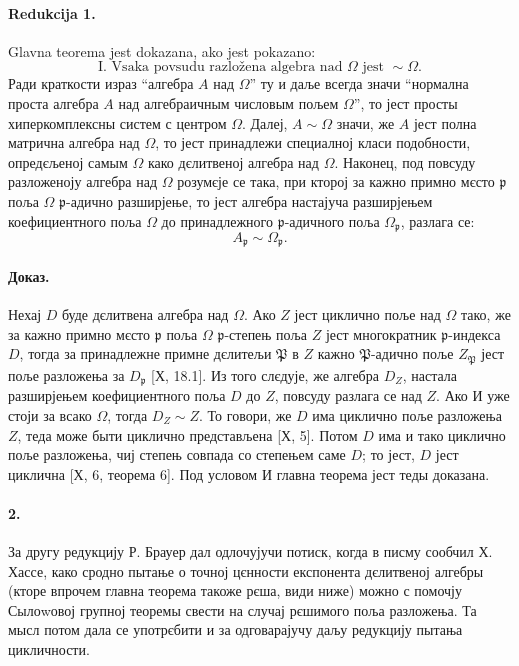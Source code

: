 \documentclass[11pt]{article}
\begin{document}
\paragraph{Redukcija 1.}
Glavna teorema jest dokazana, ako jest pokazano:
\[
\text{I. Vsaka povsudu razložena algebra nad }\Omega\text{ jest } \sim \Omega .
\]
Ради краткости израз ``алгебра \(A\) над \(\Omega\)'' ту и даље всегда значи ``нормална проста алгебра \(A\) над алгебраичным числовым пољем \(\Omega\)'', то јест просты хиперкомплексны систем с центром \(\Omega\). Далеј, \(A\sim\Omega\) значи, же \(A\) јест полна матрична алгебра над \(\Omega\), то јест принадлежи специалној класи подобности, опредєљеној самым \(\Omega\) како дєлитвеној алгебра над \(\Omega\). Наконец, под повсуду разложеноју алгебра над \(\Omega\) розумєје се така, при кторој за кажно примно мєсто \(\mathfrak p\) поља \(\Omega\) \( \mathfrak p\)-адично разширјење, то јест алгебра настајуча разширјењем коефициентного поља \(\Omega\) до принадлежного \( \mathfrak p\)-адичного поља \(\Omega_{\mathfrak p}\), разлага се:
\[
A_{\mathfrak p}\sim \Omega_{\mathfrak p}.
\]

\paragraph{Доказ.}
Нехај \(D\) буде дєлитвена алгебра над \(\Omega\). Ако \(Z\) јест циклично поље над \(\Omega\) тако, же за кажно примно мєсто \(\mathfrak p\) поља \(\Omega\) \( \mathfrak p\)-степењ поља \(Z\) јест многократник \( \mathfrak p\)-индекса \(D\), тогда за принадлежне примне дєлитељи \(\mathfrak P\) в \(Z\) кажно \( \mathfrak P\)-адично поље \(Z_{\mathfrak P}\) јест поље разложења за \(D_{\mathfrak p}\) [Х, 18.1]. Из того слєдује, же алгебра \(D_Z\), настала разширјењем коефициентного поља \(D\) до \(Z\), повсуду разлага се над \(Z\). Ако И уже стоји за всако \(\Omega\), тогда \(D_Z\sim Z\). То говори, же \(D\) има циклично поље разложења \(Z\), теда може быти циклично представљена [Х, 5]. Потом \(D\) има и тако циклично поље разложења, чиј степењ совпада со степењем саме \(D\); то јест, \(D\) јест циклична [Х, 6, теорема 6]. Под условом И главна теорема јест теды доказана.

\paragraph{2.}
За другу редукцију Р. Брауер дал одлочујучи потиск, когда в писму сообчил Х. Хассе, како сродно пытање о точној цєнности експонента дєлитвеној алгебры (кторе впрочем главна теорема такоже рєша, види ниже) можно с помочју Сылоwовој групној теоремы свести на случај рєшимого поља разложења. Та мысл потом дала се употрєбити и за одговарајучу даљу редукцију пытања цикличности.
\end{document}
